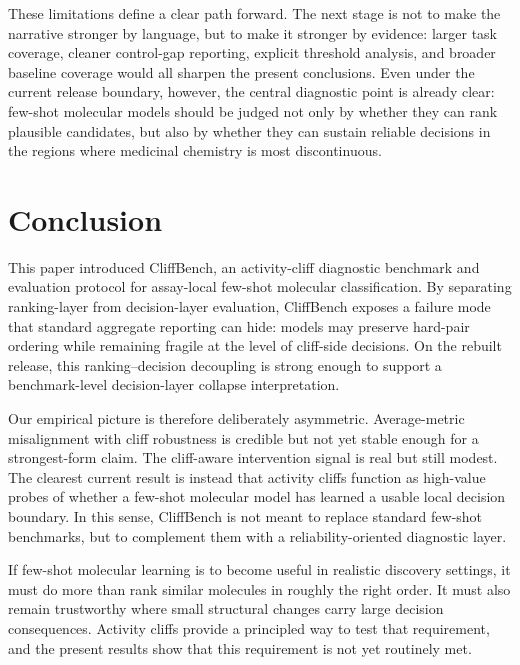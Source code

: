 \documentclass{article}
\begin{document}
These limitations define a clear path forward. The next stage is not to make the narrative stronger by language,
but to make it stronger by evidence: larger task coverage, cleaner control-gap reporting, explicit threshold
analysis, and broader baseline coverage would all sharpen the present conclusions. Even under the current release
boundary, however, the central diagnostic point is already clear: few-shot molecular models should be judged not
only by whether they can rank plausible candidates, but also by whether they can sustain reliable decisions in the
regions where medicinal chemistry is most discontinuous.

\section{Conclusion}

This paper introduced CliffBench, an activity-cliff diagnostic benchmark and evaluation protocol for assay-local
few-shot molecular classification. By separating ranking-layer from decision-layer evaluation, CliffBench exposes a
failure mode that standard aggregate reporting can hide: models may preserve hard-pair ordering while remaining
fragile at the level of cliff-side decisions. On the rebuilt release, this ranking--decision decoupling is strong
enough to support a benchmark-level decision-layer collapse interpretation.

Our empirical picture is therefore deliberately asymmetric. Average-metric misalignment with cliff robustness is
credible but not yet stable enough for a strongest-form claim. The cliff-aware intervention signal is real but
still modest. The clearest current result is instead that activity cliffs function as high-value probes of whether
a few-shot molecular model has learned a usable local decision boundary. In this sense, CliffBench is not meant to
replace standard few-shot benchmarks, but to complement them with a reliability-oriented diagnostic layer.

If few-shot molecular learning is to become useful in realistic discovery settings, it must do more than rank
similar molecules in roughly the right order. It must also remain trustworthy where small structural changes carry
large decision consequences. Activity cliffs provide a principled way to test that requirement, and the present
results show that this requirement is not yet routinely met.



\end{document}
